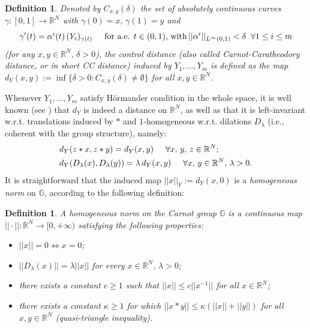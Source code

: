\documentclass{article}
\newtheorem{definition}[theorem]{Definition}
\numberwithin{equation}{section}
\begin{document}
\vspace{2mm}

\begin{definition}
    Denoted by $C_{x,y}(\delta)$ the set of absolutely continuous curves $\gamma:[0,1]\to \mathbb{R}^N$ with $\gamma(0)=x, \, \gamma(1)=y$ and
\begin{equation*}
     \gamma'(t)=\alpha^i(t) \, (Y_i)_{\gamma(t)} \hspace{5mm} \text{for a.e. } t \in (0,1), \, \text{with} \, ||\alpha^i||_{L^{\infty}(0,1)}<\delta \:\,\, \forall 1 \leq i \leq m
\end{equation*}
(for any $x,y \in \mathbb{R}^N, \, \delta>0$), the \emph{control distance} (also called \emph{Carnot-Caratheodory distance}, or in short \emph{CC distance}) induced by $Y_1,...,Y_m$ is defined as the map $d_Y(x,y):=\inf\{\delta>0: C_{x,y}(\delta) \neq \emptyset\}$ for all $x,y \in \mathbb{R}^N$.
\end{definition}

\vspace{2mm}

Whenever $Y_1,...,Y_m$ satisfy Hörmander condition in the whole space, it is well known (see \cite[Theorems 1.45-3.54]{librone}) that $d_Y$ is indeed a distance on $\mathbb{R}^N$, as well as that it is left-invariant w.r.t. translations induced by $*$ and $1$-homogeneous w.r.t. dilations $D_{\lambda}$ (i.e., coherent with the group structure), namely:
\begin{align}
    & \label{d_Y is left inv} d_Y(z * x, z * y) = d_Y(x,y) \hspace{5mm} \forall x, \, y, \, z \in \mathbb{R}^N;
    \\
    & \label{d_Y is homogeneous}
    d_Y(D_{\lambda}(x), D_{\lambda}(y)) = \lambda \, d_Y(x,y) \hspace{5mm} \forall x, \, y \in \mathbb{R}^N, \, \lambda>0.
\end{align}
It is straightforward that the induced map $||x||_Y:=d_Y(x,0)$ is a \emph{homogeneous norm} on $\mathbb{G}$, according to the following definition:

\vspace{2mm}

\begin{definition}
\label{def homogeneous norm}
    A \emph{homogeneous norm} on the Carnot group $\mathbb{G}$ is a continuous map $||\cdot || : \mathbb{R}^N \to [0,+\infty)$ satisfying the following properties:
    \begin{itemize}
        \item[(i)] $||x||=0 \iff x=0$;
        \item [(ii)] $||D_{\lambda}(x)||=\lambda ||x||$ for every $x \in \mathbb{R}^N, \, \lambda>0$;
        \item [(iii)] there exists a constant $c \geq 1$ such that $||x|| \leq c||x^{-1}||$ for all $x \in \mathbb{R}^N$;
        \item [(iv)] there exists a constant $\kappa \geq 1$ for which $||x*y|| \leq \kappa(||x||+||y||)$ for all $x,y \in \mathbb{R}^N$ (\emph{quasi-triangle inequality}).
    \end{itemize}
\end{definition}
\end{document}
